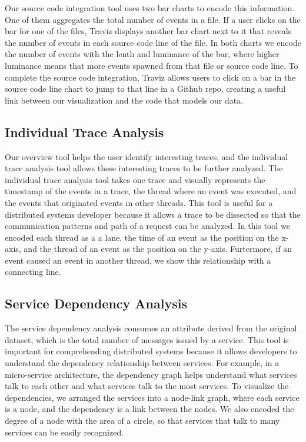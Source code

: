Our source code integration tool uses two bar charts to encode this information. One of them aggregates the total number of events in a
file. If a user clicks on the bar for one of the files, Traviz displays another bar chart next to it that
reveals the number of events in each source code line of the file. In both charts we encode the number of events with the lenth and luminance
of the bar, where higher luminance means that more events spawned from that file or source code line. To complete the
source code integration, Traviz allows users to click on a bar in the source code line chart to jump to that line in a Github repo, creating a
useful link between our visualization and the code that models our data. 

\subsection{Individual Trace Analysis}

Our overview tool helps the user identify interesting traces, and the individual trace analysis tool allows these interesting traces to be further analyzed.
The individual trace analysis tool takes one trace and visually represents the timestamp of the events in a trace,
the thread where an event was executed, and the events that originated events in other threads. This tool is useful for a distributed systems
developer because it allows a trace to be dissected so that the communication patterns and path of a request can be analyzed. In this tool we
encoded each thread as a a lane, the time of an event as the position on the x-axis, and the thread of an event as the position on the y-axis. Furtermore,
if an event caused an event in another thread, we show this relationship with a connecting line.

\subsection{Service Dependency Analysis}

The service dependency analysis consumes an attribute derived from the original dataset, which is the total number of messages issued by
a service. This tool is important for comprehending distributed systems because it allows developers to understand the
dependency relationship between services. For example, in a micro-service architecture, the dependency graph helps understand what services
talk to each other and what services talk to the most services. To visualize the dependencies, we arranged the services into
a node-link graph, where each service is a node, and the dependency is a link between the nodes. We also encoded the degree of a node with the area of
a circle, so that services that talk to many services can be easily recognized. 

